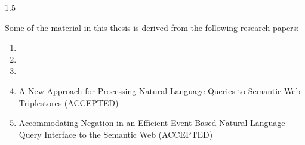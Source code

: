 \documentclass[fleqn, oneside, 12pt]{book}
\theoremstyle{definitionsty}
\newcommand{\uwinonehalfspacelen}{1.5}
\newcommand{\uwindefaultspacelen}{\uwinonehalfspacelen}
\newenvironment{uwindefaultspaceenv}%
{\begin{spacing}{\uwindefaultspacelen}}%
	{\end{spacing}}
\begin{document}
\begin{uwindefaultspaceenv}


	Some of the material in this thesis is derived from the following research
	papers:










\end{uwindefaultspaceenv}





\begin{enumerate}
    \item {}

    \item {}

    \item {}

    \item A New Approach for Processing Natural-Language Queries to Semantic Web Triplestores (ACCEPTED) %

    \item Accommodating Negation in an Efficient Event-Based Natural Language Query Interface to the Semantic Web (ACCEPTED) %
\end{enumerate}
\end{document}
